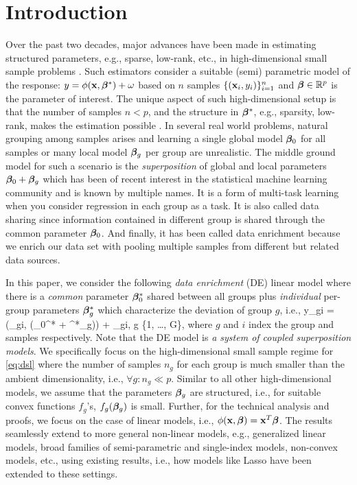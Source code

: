 \section{Introduction}
Over the past two decades, major advances have been made in estimating structured parameters, e.g., sparse, low-rank, etc., in high-dimensional small sample problems \cite{donoho2006compressed,candes2010power,friedman2008sparse}. Such estimators consider a suitable (semi) parametric model of the response: $y = \phi(\mathbf{x},\boldsymbol{\beta}^*) + \omega$ based on $n$ samples $\{(\mathbf{x}_i,y_i)\}_{i=1}^n$ and $\boldsymbol{\beta} \in \mathbb R^p$ is the parameter of interest. The unique aspect of such high-dimensional setup is that the number of samples $n < p$, and the structure in $\boldsymbol{\beta}^*$, e.g., sparsity, low-rank, makes the estimation possible \cite{tibshirani1996regression,candes2006robust,candes2009exact}. In several real world problems, natural grouping among samples arises and learning a single global model $\boldsymbol{\beta}_0$ for all samples or many local model $\boldsymbol{\beta}_g$ per group are unrealistic. The middle ground model for such a scenario is the \emph{superposition} of global and local parameters $\boldsymbol{\beta}_0 + \boldsymbol{\beta}_g$ which has been of recent interest in the statistical machine learning community \cite{guba16} and is known by multiple names. It is a form of multi-task learning \cite{Zhang2017-rm, jrsr10} when you consider regression in each group as a task. It is also called data sharing \cite{grti16} since information contained in different group is shared through the common parameter $\boldsymbol{\beta}_0$. And finally, it has been called data enrichment \cite{Chen2015-fj, Asiaee2018-eg} because we enrich our data set with pooling multiple samples from different but related data sources.


In this paper, we consider the following \emph{data enrichment} (DE) linear model where there is a \emph{common} parameter $\boldsymbol{\beta}^*_0$ shared between all groups plus \emph{individual} per-group parameters $\boldsymbol{\beta}_g^*$ which characterize the deviation of group $g$, i.e.,
\be
\label{eq:dsl}
y_{gi} = \phi(\x_{gi}, (\bbeta_0^* + \bbeta^*_g)) + \omega_{gi}, \quad g \in \{1, \dots, G\},
\ee
where $g$ and $i$ index the group and samples respectively. %
Note that the DE model is \emph{a system of coupled superposition models}.
We specifically focus on the high-dimensional small sample regime for \eqref{eq:dsl} where the number of samples $n_g$ for each group is much smaller than the ambient dimensionality, i.e., $\forall g: n_g \ll p$. Similar to all other high-dimensional models, we assume that the parameters $\boldsymbol{\beta}_g$ are structured, i.e., for suitable convex functions $f_g$'s, $f_g(\boldsymbol{\beta}_g)$ is small. Further, for the technical analysis and proofs,
we focus on the case of linear models, i.e., $\phi(\mathbf{x},\boldsymbol{\beta}) = \mathbf{x}^T \boldsymbol{\beta}$. The results seamlessly extend to more general non-linear models, e.g., generalized linear models, broad families of semi-parametric and single-index models, non-convex models, etc., using existing results, i.e., how models like Lasso have been extended to these settings. %


